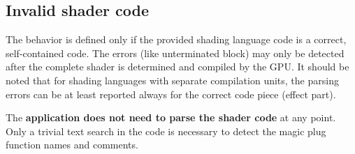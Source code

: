 \documentclass{egpubl}
\begin{document}
\subsection{Invalid shader code}

The behavior is defined only if the provided shading language code
is a correct, self-contained code. The errors (like unterminated block)
may only be detected after the complete shader
is determined and compiled by the GPU.
It should be noted that for shading languages with separate compilation units,
the parsing errors can be at least reported always for the correct code piece
(effect part).

The \textbf{application does not need to parse the shader code} at any point.
Only a trivial text search in the code is necessary to detect the magic
plug function names and comments.



\end{document}
